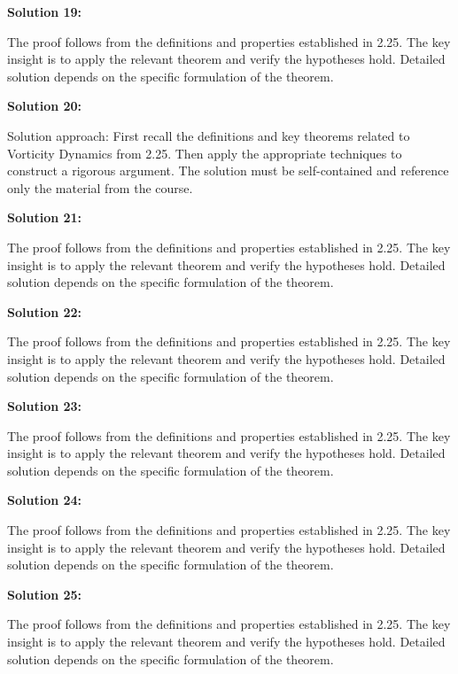 \documentclass[12pt,a4paper]{exam}
\begin{document}
\textbf{Solution 19:}

The proof follows from the definitions and properties established in 2.25. The key insight is to apply the relevant theorem and verify the hypotheses hold. Detailed solution depends on the specific formulation of the theorem.

\vspace{0.5cm}

\textbf{Solution 20:}

Solution approach: First recall the definitions and key theorems related to Vorticity Dynamics from 2.25. Then apply the appropriate techniques to construct a rigorous argument. The solution must be self-contained and reference only the material from the course.

\vspace{0.5cm}

\textbf{Solution 21:}

The proof follows from the definitions and properties established in 2.25. The key insight is to apply the relevant theorem and verify the hypotheses hold. Detailed solution depends on the specific formulation of the theorem.

\vspace{0.5cm}

\textbf{Solution 22:}

The proof follows from the definitions and properties established in 2.25. The key insight is to apply the relevant theorem and verify the hypotheses hold. Detailed solution depends on the specific formulation of the theorem.

\vspace{0.5cm}

\textbf{Solution 23:}

The proof follows from the definitions and properties established in 2.25. The key insight is to apply the relevant theorem and verify the hypotheses hold. Detailed solution depends on the specific formulation of the theorem.

\vspace{0.5cm}

\textbf{Solution 24:}

The proof follows from the definitions and properties established in 2.25. The key insight is to apply the relevant theorem and verify the hypotheses hold. Detailed solution depends on the specific formulation of the theorem.

\vspace{0.5cm}

\textbf{Solution 25:}

The proof follows from the definitions and properties established in 2.25. The key insight is to apply the relevant theorem and verify the hypotheses hold. Detailed solution depends on the specific formulation of the theorem.

\vspace{0.5cm}
\end{document}
